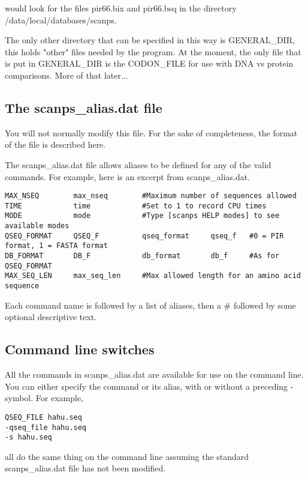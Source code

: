 \documentclass[12pt]{article}
\begin{document}
would look for the files pir66.bix and pir66.bsq in the directory
/data/local/databases/scanps.

The only other directory that can be specified in this way is
GENERAL\_DIR, this holds "other" files needed by the program.  At the
moment, the only file that is put in GENERAL\_DIR is the CODON\_FILE for
use with DNA vs protein comparisons.  More of that later...


\subsection{The scanps\_alias.dat file}

You will not normally modify this file.  For the sake of completeness,
the format of the file is described here.

The scanps\_alias.dat file allows aliases to be defined for any of the
valid commands.  For example, here is an excerpt from scanps\_alias.dat.

\begin{scriptsize}
\begin{verbatim}
MAX_NSEQ        max_nseq        #Maximum number of sequences allowed
TIME            time            #Set to 1 to record CPU times
MODE            mode            #Type [scanps HELP modes] to see available modes
QSEQ_FORMAT     QSEQ_F          qseq_format     qseq_f   #0 = PIR format, 1 = FASTA format
DB_FORMAT       DB_F            db_format       db_f     #As for QSEQ_FORMAT
MAX_SEQ_LEN     max_seq_len     #Max allowed length for an amino acid sequence
\end{verbatim}
\end{scriptsize}

Each command name is followed by a list of aliases, then a \# followed by 
some optional descriptive text. 

\subsection{Command line switches}

All the commands in scanps\_alias.dat are available for use on the
command line.  You can either specify the command or its alias, with
or without a preceding - symbol.  For example, 

\begin{verbatim}
QSEQ_FILE hahu.seq
-qseq_file hahu.seq
-s hahu.seq
\end{verbatim}

all do the same thing on the command line assuming the standard
scanps\_alias.dat file has not been modified.
\end{document}
